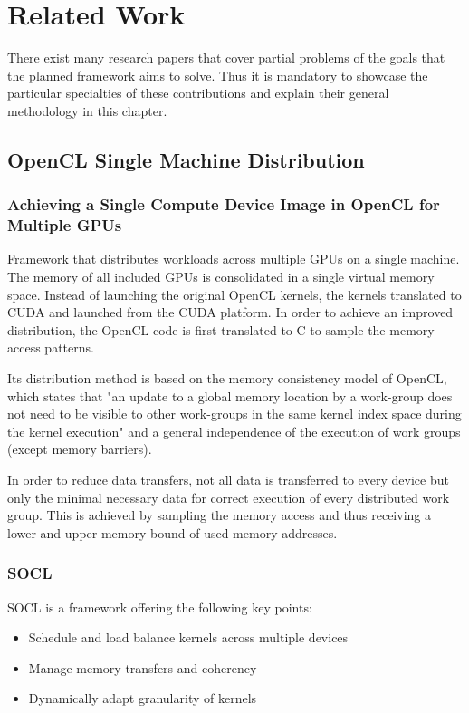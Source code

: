 
\chapter{Related Work}
There exist many research papers that cover partial problems of the goals that the planned framework aims to solve. Thus it is mandatory to showcase the particular specialties of these contributions and explain their general methodology in this chapter.

\section{OpenCL Single Machine Distribution}

\subsection{Achieving a Single Compute Device Image in OpenCL for Multiple GPUs\cite{Kim_2011}}
Framework that distributes workloads across multiple GPUs on a single machine. The memory of all included GPUs is consolidated in a single virtual memory space.
Instead of launching the original OpenCL kernels, the kernels translated to CUDA and launched from the CUDA platform. In order to achieve an improved distribution, the OpenCL code is first translated to C to sample the memory access patterns.

Its distribution method is based on the memory consistency model of OpenCL, which states that "an update to a global memory location by a work-group does not need to be visible to other work-groups in the same kernel index space during the kernel execution" and a general independence of the execution of work groups (except memory barriers).

In order to reduce data transfers, not all data is transferred to every device but only the minimal necessary data for correct execution of every distributed work group. This is achieved by sampling the memory access and thus receiving a lower and upper memory bound of used memory addresses.

\subsection{SOCL\cite{socl}}
SOCL is a framework offering the following key points:
\begin{itemize}
    \item Schedule and load balance kernels across multiple devices
    \item Manage memory transfers and coherency
    \item Dynamically adapt granularity of kernels
\end{itemize}

